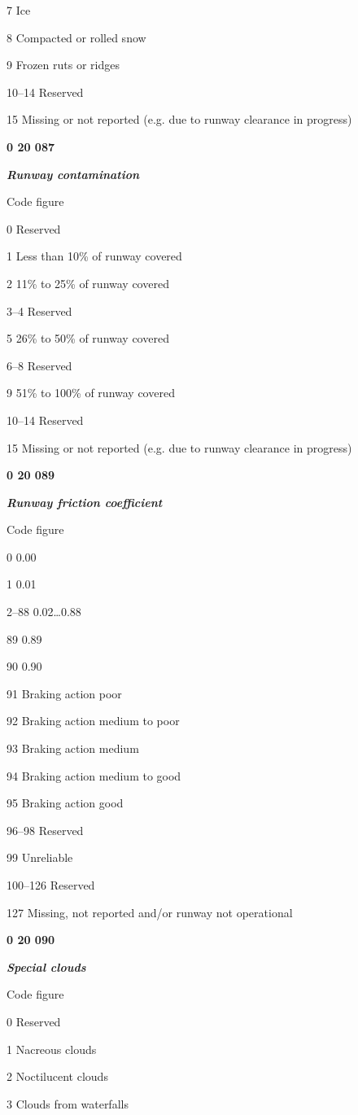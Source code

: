 7 Ice

8 Compacted or rolled snow

9 Frozen ruts or ridges

10--14 Reserved

15 Missing or not reported (e.g. due to runway clearance in progress)

\textbf{0 20 087}

\emph{\textbf{Runway contamination}}

Code figure

0 Reserved

1 Less than 10\% of runway covered

2 11\% to 25\% of runway covered

3--4 Reserved

5 26\% to 50\% of runway covered

6--8 Reserved

9 51\% to 100\% of runway covered

10--14 Reserved

15 Missing or not reported (e.g. due to runway clearance in progress)

\textbf{0 20 089}

\emph{\textbf{Runway friction coefficient}}

Code figure

0 0.00

1 0.01

2--88 0.02\ldots0.88

89 0.89

90 0.90

91 Braking action poor

92 Braking action medium to poor

93 Braking action medium

94 Braking action medium to good

95 Braking action good

96--98 Reserved

99 Unreliable

100--126 Reserved

127 Missing, not reported and/or runway not operational

\textbf{0 20 090}

\emph{\textbf{Special clouds}}

Code figure

0 Reserved

1 Nacreous clouds

2 Noctilucent clouds

3 Clouds from waterfalls

